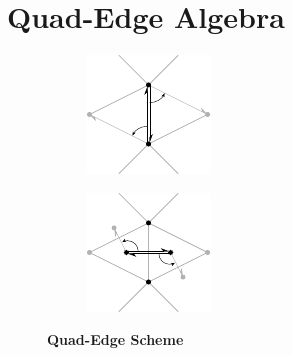 \documentclass{stdlocal}
\begin{document}
\section{Quad-Edge Algebra} %
\label{sec:quad_edge_algebra}

\begin{figure}
  \centering
  \begin{subfigure}[b]{0.4\linewidth}
    \centering
    \includegraphics[width=\linewidth]{figures/quad-edge-edge.pdf}
  \end{subfigure}
  \hfill
  \begin{subfigure}[b]{0.4\linewidth}
    \centering
    \includegraphics[width=\linewidth]{figures/quad-edge-dual.pdf}
  \end{subfigure}
  \caption[Quad-Edge Scheme]{
    \textbf{Quad-Edge Scheme}\\
  }
\end{figure}
\end{document}
